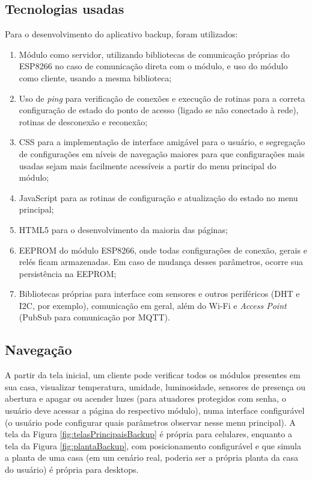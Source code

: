 \subsection{Tecnologias usadas}

Para o desenvolvimento do aplicativo backup, foram utilizados:

\begin{enumerate}
	\item Módulo como servidor, utilizando bibliotecas de comunicação próprias do ESP8266 no caso de comunicação direta com o módulo, e uso do módulo como cliente, usando a mesma biblioteca;
	\item Uso de \emph{ping} para verificação de conexões e execução de rotinas para a correta configuração de estado do ponto de acesso (ligado se não conectado à rede), rotinas de desconexão e reconexão;
	\item CSS para a implementação de interface amigável para o usuário, e segregação de configurações em níveis de navegação maiores para que configurações mais usadas sejam mais facilmente acessíveis a partir do menu principal do módulo;
	\item JavaScript para as rotinas de configuração e atualização do estado no menu principal;
	\item HTML5 para o desenvolvimento da maioria das páginas;
	\item EEPROM do módulo ESP8266, onde todas configurações de conexão, gerais e relés ficam armazenadas. Em caso de mudança desses parâmetros, ocorre sua persistência na EEPROM;
	\item Bibliotecas próprias para interface com sensores e outros periféricos (DHT e I2C, por exemplo), comunicação em geral, além do Wi-Fi e \emph{Access Point} (PubSub para comunicação por MQTT).
\end{enumerate}

\subsection{Navegação}

A partir da tela inicial, um cliente pode verificar todos os módulos presentes em sua casa, visualizar temperatura, umidade, luminosidade, sensores de presença ou abertura e apagar ou acender luzes (para atuadores protegidos com senha, o usuário deve acessar a página do respectivo módulo), numa interface configurável (o usuário pode configurar quais parâmetros observar nesse menu principal). A tela da Figura \ref{fig:telasPrincipaisBackup} é própria para celulares, enquanto a tela da Figura \ref{fig:plantaBackup}, com posicionamento configurável e que simula a planta de uma casa (em um cenário real, poderia ser a própria planta da casa do usuário) é própria para desktops.

